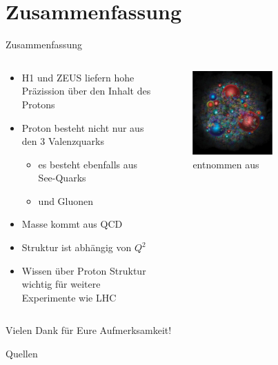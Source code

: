\documentclass[aspectratio=1610, 9pt]{beamer}
\begin{document}
\section{Zusammenfassung}
\begin{frame}{Zusammenfassung}
  \begin{columns}
    \begin{column}{0.4\textwidth}
      \begin{itemize}
        \item{H1 und ZEUS liefern hohe Präzission über den Inhalt des Protons}
        \item{Proton besteht nicht nur aus den 3 Valenzquarks}
        \begin{itemize}
          \item{es besteht ebenfalls aus See-Quarks}
          \item{und Gluonen}
        \end{itemize}
        \item{Masse kommt aus QCD}
        \item{Struktur ist abhängig von $Q^2$}
        \item{Wissen über Proton Struktur wichtig für weitere Experimente wie LHC}
      \end{itemize}
    \end{column}

    \begin{column}{0.6\textwidth}
      \begin{figure}
        \centering
        \includegraphics[width=0.6\textwidth]{images/proton-courier.png}
        \caption{entnommen aus \cite{Courier}}
      \end{figure}
    \end{column}
  \end{columns}
\end{frame}

\begin{frame}
\centering
\Huge{Vielen Dank für Eure Aufmerksamkeit!}
\end{frame}

\begin{frame}[allowframebreaks]{Quellen}
  \printbibliography
\end{frame}
\end{document}
